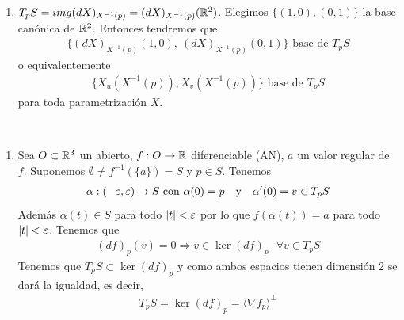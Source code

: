 \begin{observacion}
\begin{enumerate}
        \item $T_pS = img(dX)_{X^{-1}(p)} = (dX)_{X^{-1}(p)}(\mathbb{R}^2)$. Elegimos $\{(1,0), (0,1)\}$ la base canónica de $\mathbb{R}^2$. Entonces tendremos que 
        \begin{gather*}
            \{(dX)_{X^{-1}(p)}(1,0),\ (dX)_{X^{-1}(p)}(0,1)\} \text{ base de } T_pS
        \end{gather*}
        o equivalentemente
        \begin{gather*}
            \{X_u(X^{-1}(p)), X_v(X^{-1}(p))\} \text{ base de } T_pS
        \end{gather*}
        para toda parametrización $X$.
    \end{enumerate}
\end{observacion}

\begin{ejemplo}\
    \begin{enumerate}
        \item Sea $O\subset \mathbb{R}^3$ un abierto, $f:O\to \mathbb{R}$ diferenciable (AN), $a$ un valor regular de $f$. Suponemos $\emptyset \neq f^{-1}(\{a\}) = S$ y $p\in S$. Tenemos 
        \begin{gather*}
            \alpha : (-\veps, \veps) \to S\text{ con } \alpha(0)=p\ \ \text{ y } \ \ \alpha'(0)=v\in T_pS
        \end{gather*}
        Además $\alpha(t)\in S$ para todo $|t|<\varepsilon$ por lo que $f(\alpha(t)) = a$ para todo $|t| < \varepsilon$. Tenemos que 
        \begin{gather*}
            (df)_p(v) = 0 \Rightarrow v \in \ker(df)_p\ \ \ \forall v \in T_pS
        \end{gather*}
        Tenemos que $T_pS \subset \ker(df)_p$ y como ambos espacios tienen dimensión 2 se dará la igualdad, es decir,
        \begin{gather*}
            T_pS = \ker(df)_p = \langle \nabla f_p \rangle^{\bot}
        \end{gather*}


\end{enumerate}
\end{ejemplo}
